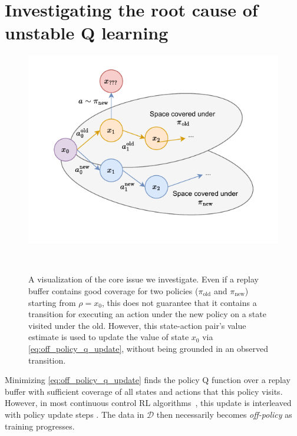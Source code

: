 \section{Investigating the root cause of unstable Q learning}

\begin{figure}[t]
\begin{minipage}{0.6\textwidth}
    \includegraphics[width=\textwidth]{illustrations/mad-td/rl_sequences.drawio.pdf}
\end{minipage}
~
\begin{minipage}{0.39\textwidth}
    \caption{A visualization of the core issue we investigate. Even if a replay buffer contains good coverage for two policies ($\pi_\mathrm{old}$ and $\pi_\mathrm{new}$) starting from $\rho=x_0$, this does not guarantee that it contains a transition for executing an action under the new policy on a state visited under the old. However, this state-action pair's value estimate is used to update the value of state $x_0$ via \autoref{eq:off_policy_q_update}, without being grounded in an observed transition.}
    \label{ill:coverage}
\end{minipage}
\end{figure}
    

Minimizing \autoref{eq:off_policy_q_update} finds the policy Q function over a replay buffer with sufficient coverage of all states and actions that this policy visits.
However, in most continuous control RL algorithms~\parencite{ddpg,haarnoja2018sac, fujimoto2018addressing}, this update is interleaved with policy update steps .
The data in $\mathcal{D}$ then necessarily becomes \emph{off-policy} as training progresses. 

